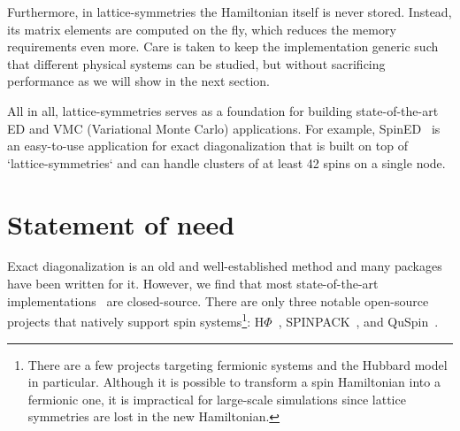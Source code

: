 Furthermore, in lattice-symmetries the Hamiltonian itself is never stored. Instead, its matrix elements are computed on the fly, which reduces the memory requirements even more. Care is taken to keep the implementation generic such that different physical systems can be studied, but without sacrificing performance as we will show in the next section.

All in all, lattice-symmetries serves as a foundation for building state-of-the-art ED and VMC (Variational Monte Carlo) applications. For example, SpinED~\cite{SpinED} is an easy-to-use application for exact diagonalization that is built on top of `lattice-symmetries` and can handle clusters of at least 42 spins on a single node.

\section{Statement of need}

Exact diagonalization is an old and well-established method and many packages have been written for it. However, we find that most state-of-the-art implementations~\cite{Wietek2018subla,Lauchl2019Kagome} are closed-source. There are only three notable open-source projects that natively support spin systems\footnote{%
There are a few projects targeting fermionic systems and the Hubbard model in particular. Although it is possible to transform a spin Hamiltonian into a fermionic one, it is impractical for large-scale simulations since lattice symmetries are lost in the new Hamiltonian.}: $\text{H}\Phi$~\cite{Kawamura2017quant}, SPINPACK~\cite{Schule2017Spinpack}, and QuSpin~\cite{Weinbe2017QuspinAPytho}.

